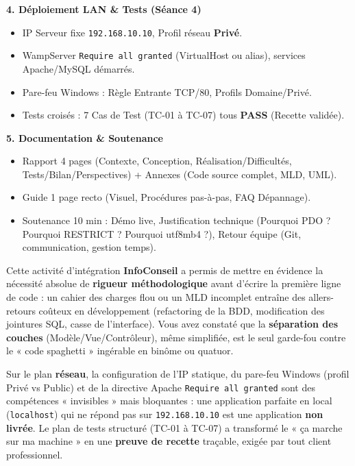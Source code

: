 \documentclass[11pt]{article}
\newcounter{popsec}
\newcounter{popsub}
\newcommand{\courssub}[1]{%
  \stepcounter{popsub}%
  \par\vspace{9pt}\noindent{\popxbold\fontsize{11.5}{13}\selectfont\color{popink}{\color{poporange}\thepopsec.\thepopsub}\hspace{6pt}#1}\par\nopagebreak\vspace{4pt}
}
\begin{document}
\begin{exoresolu}
\textbf{4. Déploiement LAN \& Tests (Séance 4)}
\begin{itemize}
    \item IP Serveur fixe \texttt{192.168.10.10}, Profil réseau \textbf{Privé}.
    \item WampServer \texttt{Require all granted} (VirtualHost ou alias), services Apache/MySQL démarrés.
    \item Pare-feu Windows : Règle Entrante TCP/80, Profils Domaine/Privé.
    \item Tests croisés : 7 Cas de Test (TC-01 à TC-07) tous \textbf{PASS} (Recette validée).
\end{itemize}

\textbf{5. Documentation \& Soutenance}
\begin{itemize}
    \item Rapport 4 pages (Contexte, Conception, Réalisation/Difficultés, Tests/Bilan/Perspectives) + Annexes (Code source complet, MLD, UML).
    \item Guide 1 page recto (Visuel, Procédures pas-à-pas, FAQ Dépannage).
    \item Soutenance 10 min : Démo live, Justification technique (Pourquoi PDO ? Pourquoi RESTRICT ? Pourquoi utf8mb4 ?), Retour équipe (Git, communication, gestion temps).
\end{itemize}
\end{exoresolu}

\courssub{Bilan de l'activité}
Cette activité d'intégration \textbf{InfoConseil} a permis de mettre en évidence la nécessité absolue de \textbf{rigueur méthodologique} avant d'écrire la première ligne de code : un cahier des charges flou ou un MLD incomplet entraîne des allers-retours coûteux en développement (refactoring de la BDD, modification des jointures SQL, casse de l'interface). Vous avez constaté que la \textbf{séparation des couches} (Modèle/Vue/Contrôleur), même simplifiée, est le seul garde-fou contre le « code spaghetti » ingérable en binôme ou quatuor.

Sur le plan \textbf{réseau}, la configuration de l'IP statique, du pare-feu Windows (profil Privé vs Public) et de la directive Apache \texttt{Require all granted} sont des compétences « invisibles » mais bloquantes : une application parfaite en local (\texttt{localhost}) qui ne répond pas sur \texttt{192.168.10.10} est une application \textbf{non livrée}. Le plan de tests structuré (TC-01 à TC-07) a transformé le « ça marche sur ma machine » en une \textbf{preuve de recette} traçable, exigée par tout client professionnel.
\end{document}
